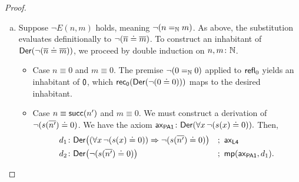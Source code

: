 \begin{proof}
\begin{enumerate}[a),font=\upshape]
        \item Suppose $\neg E(n,m)$ holds, meaning $\neg(n\mathrel{=_{\mathbb{N}}} m)$. As above, the substitution evaluates definitionally to $\neg({\overline{n}}\doteq{\overline{m}})$. To construct an inhabitant of $\mathsf{Der}(\neg({\overline{n}}\doteq{\overline{m}}))$, we proceed by double induction on $n,m\colon\N$.
        \begin{itemize}
            \item Case $n\equiv0$ and $m\equiv0$. The premise $\neg(0\mathrel{=_{\mathbb{N}}}0)$ applied to $\mathsf{refl}_0$ yields an inhabitant of $\mathsf{0}$, which $\mathsf{rec}_{\mathsf{0}}(\mathsf{Der}(\neg(0\doteq0)))$ maps to the desired inhabitant.
            
            \item Case $n\equiv\mathsf{succ}(n')$ and $m\equiv0$. We must construct a derivation of $\neg(s({\overline{n'}})\doteq0)$. We have the axiom
            $
                \fun{ax}_{\fun{PA1}}\colon\fun{Der}(
                    \forall x\,\neg(s(x)\doteq 0)
                ).
            $
            Then,
            {\small
            \begin{align*}
                d_1&\colon\fun{Der}\bigl(
                    (\forall x\,\neg(s(x)\doteq0))
                    \imp
                    \neg(s(\num{n'})\doteq0)
                \bigr)
                    &&;\ \fun{ax}_{\fun{L4}}\\
                d_2&\colon\fun{Der}\bigl(
                    \neg(s(\num{n'})\doteq0)
                \bigr)
                    &&;\ \fun{mp}(\fun{ax}_{\fun{PA1}},d_1).
            \end{align*}}
            

\end{itemize}
\end{enumerate}
\end{proof}
